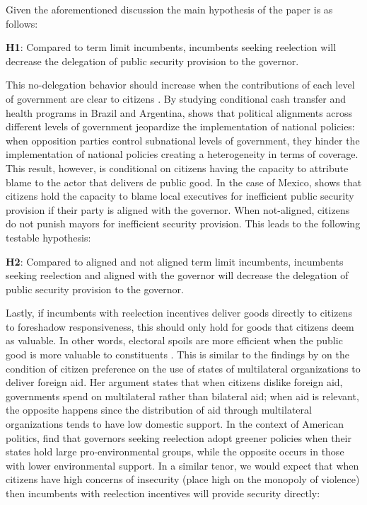 \documentclass[12pt]{amsart}
\makeatletter
\def\subsection{\@startsection{subsection}{2}
	\z@{.8\linespacing\@plus.7\linespacing}{.7\linespacing}{\large}}
\numberwithin{equation}{section}
\theoremstyle{definition}
\theoremstyle{definition}
\theoremstyle{definition}
\makeatother
\begin{document}
        
\subsection{Hypotheses \label{sec:hypotheses}}

Given the aforementioned discussion the main hypothesis of the paper is as follows:
\bigskip

\textbf{H1}: Compared to term limit incumbents, incumbents seeking reelection will decrease the delegation of public security provision to the governor. 
\bigskip

This no-delegation behavior should increase when the contributions of each level of government are clear to citizens \citep{treisman_2000}. By studying conditional cash transfer and health programs in Brazil and Argentina, \citet{niedzwiecki_2018} shows that political alignments across different levels of government jeopardize the implementation of national policies: when opposition parties control subnational levels of government, they hinder the implementation of national policies creating a heterogeneity in terms of coverage. This result, however, is conditional on citizens having the capacity to attribute blame to the actor that delivers de public good. In the case of Mexico, \citet{ley_2017} shows that citizens hold the capacity to blame local executives for inefficient public security provision if their party is aligned with the governor. When not-aligned, citizens do not punish mayors for inefficient security provision. This leads to the following testable hypothesis: 

\bigskip

\textbf{H2}: Compared to aligned and not aligned term limit incumbents, incumbents seeking reelection and aligned with the governor will decrease the delegation of public security provision to the governor.
\bigskip

Lastly, if incumbents with reelection incentives deliver goods directly to citizens to foreshadow responsiveness, this should only hold for goods that citizens deem as valuable. In other words, electoral spoils are more efficient when the public good is more valuable to constituents \citep{lizzeri_2001}. This is similar to the findings by \citet{milner_2004} on the condition of citizen preference on the use of states of multilateral organizations to deliver foreign aid.  Her argument states that when citizens dislike foreign aid, governments spend on multilateral rather than bilateral aid; when aid is relevant, the opposite happens since the distribution of aid through multilateral organizations tends to have low domestic support. In the context of American politics, \citet{list_sturm_2006} find that governors seeking reelection adopt greener policies when their states hold large pro-environmental groups, while the opposite occurs in those with lower environmental support. In a similar tenor, we would expect that when citizens have high concerns of insecurity (place high on the monopoly of violence) then incumbents with reelection incentives will provide security directly:
\end{document}
